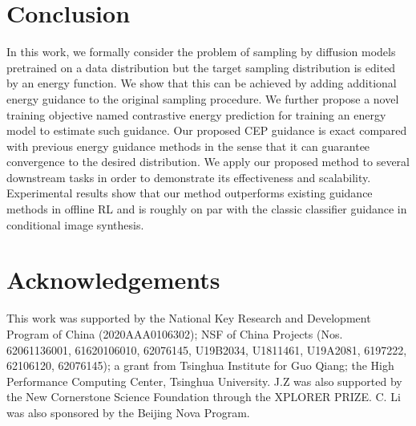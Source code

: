 \documentclass{article}
\theoremstyle{plain}
\theoremstyle{definition}
\theoremstyle{remark}
\begin{document}








\section{Conclusion}
In this work, we formally consider the problem of sampling by diffusion models pretrained on a data distribution but the target sampling distribution is edited by an energy function. We show that this can be achieved by adding additional energy guidance to the original sampling procedure. We further propose a novel training objective named contrastive energy prediction for training an energy model to estimate such guidance. Our proposed CEP guidance is exact compared with previous energy guidance methods in the sense that it can guarantee convergence to the desired distribution. We apply our proposed method to several downstream tasks in order to demonstrate its effectiveness and scalability. Experimental results show that our method outperforms existing guidance methods in offline RL and is roughly on par with the classic classifier guidance in conditional image synthesis.


\section*{Acknowledgements}
This work was supported by the National Key Research and Development Program of China
(2020AAA0106302); 
NSF of China Projects (Nos. 62061136001, 61620106010, 62076145, U19B2034, U1811461, U19A2081, 6197222, 62106120, 62076145); a grant from Tsinghua Institute for Guo Qiang; the High Performance Computing Center, Tsinghua University. J.Z was also supported by the New Cornerstone Science Foundation through the XPLORER PRIZE. C. Li was also sponsored by the Beijing Nova Program.









\nocite{langley00}





\newpage
\appendix
\onecolumn



\end{document}
